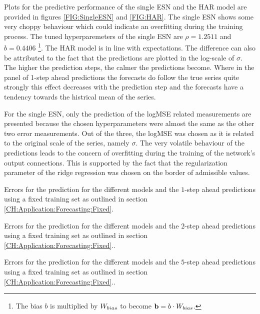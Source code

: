 Plots for the predictive performance of the single ESN and the HAR model are provided in figures \ref{FIG:SingleESN} and \ref{FIG:HAR}. The single ESN shows some very choppy behaviour which could indicate an overfitting during the training process. The tuned hyperparemeters of the single ESN are $\rho = 1.2511$ and $b = 0.4406$ \footnote{The bias $b$ is multiplied by $W_{bias}$ to become ${\bf b} = b \cdot W_{bias}$.}. The HAR model is in line with expectations. The difference can also be attributed to the fact that the predictions are plotted in the log-scale of $\sigma$. The higher the prediction steps, the calmer the predictions become. Where in the panel of 1-step ahead predictions the forecasts do follow the true series quite strongly this effect decreases with the prediction step and the forecasts have a tendency towards the histrical mean of the series.

For the single ESN, only the prediction of the logMSE related measurements are presented because the chosen hyperparameters were almost the same as the other two error measurements. Out of the three, the logMSE was chosen as it is related to the original scale of the series, namely $\sigma$. The very volatile behaviour of the predictions leads to the concern of overfitting during the training of the network's output connections. This is supported by the fact that the regularization parameter of the ridge regression was chosen on the border of admissible values.

\begin{table}
    \begin{center}
        
    \end{center}
    \caption{Errors for the prediction for the different models and the $1$-step ahead predictions using a fixed training set as outlined in section \ref{CH:Application:Forecasting:Fixed}.}
    \label{TABLE:1step}
\end{table} 

\begin{table}
    \begin{center}
        
    \end{center}
    \caption{Errors for the prediction for the different models and the $2$-step ahead predictions using a fixed training set as outlined in section \ref{CH:Application:Forecasting:Fixed}..}
    \label{TABLE:2step}
\end{table}

\begin{table}
    \begin{center}
        
    \end{center}
    \caption{Errors for the prediction for the different models and the $5$-step ahead predictions using a fixed training set as outlined in section \ref{CH:Application:Forecasting:Fixed}..}
    \label{TABLE:5step}
\end{table}

